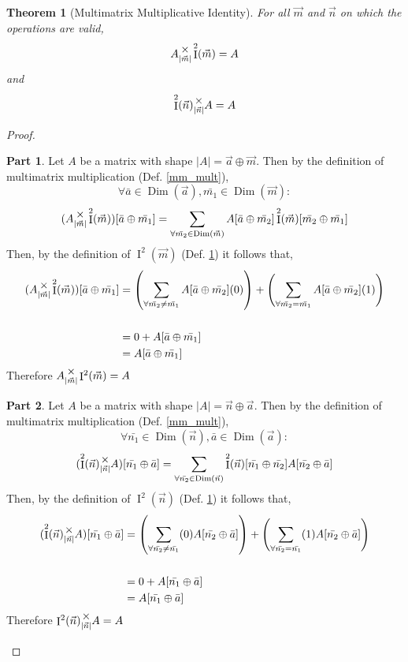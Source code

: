 \documentclass[12pt]{book}
\theoremstyle{plain}
\newtheorem{theorem}{Theorem}[chapter]
\theoremstyle{definition}
\theoremstyle{ppart}
\newtheorem{ppart}{Part}
\theoremstyle{case}
\theoremstyle{solution}
\DeclareMathOperator{\Dim}{Dim}
\DeclareMathOperator{\Ident}{I}
\newcommand{\mmult}[1]{\text{\raisebox{1ex}{$\underset{#1}{\times}$}}}
\begin{document}
\begin{theorem}[Multimatrix Multiplicative Identity]
\label{mm_ident}
For all $\vec{m}$ and $\vec{n}$ on which the operations are valid,
\[
 A \mmult{|\vec{m}|} \Ident^2(\vec{m}) = A
\]
and
\[
 \Ident^2(\vec{n}) \mmult{|\vec{n}|} A = A
\]
\end{theorem}
\begin{proof}
\begin{ppart}
Let $A$ be a matrix with shape $|A| = \vec{a} \oplus \vec{m}$.
Then by the definition of multimatrix multiplication (Def. \ref{mm_mult}),
\[ \forall \bar{a} \in \Dim(\vec{a}), \bar{m_1} \in \Dim(\vec{m}) : \]
\[
 (A \mmult{|\vec{m}|} \Ident^2(\vec{m}))[\bar{a} \oplus \bar{m_1}]
 =
 \sum_{\forall \bar{m_2} \in \Dim(\vec{m})}
 A[\bar{a} \oplus \bar{m_2}] \Ident^2(\vec{m})[\bar{m_2} \oplus \bar{m_1}]
\]
Then, by the definition of $\Ident^2(\vec{m})$ (Def. \ref{mm_ident}) it follows
that,
\begin{align*}
 (A \mmult{|\vec{m}|} \Ident^2(\vec{m}))[\bar{a} \oplus \bar{m_1}]
 &=
 \left(
  \sum_{\forall \bar{m_2} \ne \bar{m_1}}
  A[\bar{a} \oplus \bar{m_2}] (0)
 \right)
 +
 \left(
  \sum_{\forall \bar{m_2} = \bar{m_1}}
  A[\bar{a} \oplus \bar{m_2}] (1)
 \right) \\
 \\
 &= 0 + A[\bar{a} \oplus \bar{m_1}] \\
 &= A[\bar{a} \oplus \bar{m_1}]
\end{align*}
Therefore $A \mmult{|\vec{m}|} \Ident^2(\vec{m}) = A$
\end{ppart}
\begin{ppart}
Let $A$ be a matrix with shape $|A| = \vec{n} \oplus \vec{a}$.
Then by the definition of multimatrix multiplication (Def. \ref{mm_mult}),
\[ \forall  \bar{n_1} \in \Dim(\vec{n}), \bar{a} \in \Dim(\vec{a}) : \]
\[
 (\Ident^2(\vec{n}) \mmult{|\vec{n}|} A)[\bar{n_1} \oplus \bar{a}]
 =
 \sum_{\forall \bar{n_2} \in \Dim(\vec{n})}
 \Ident^2(\vec{n})[\bar{n_1} \oplus \bar{n_2}]A[\bar{n_2} \oplus \bar{a}] 
\]
Then, by the definition of $\Ident^2(\vec{n})$ (Def. \ref{mm_ident}) it follows
that,
\begin{align*}
 (\Ident^2(\vec{n}) \mmult{|\vec{n}|} A)[\bar{n_1} \oplus \bar{a}]
 &=
 \left(
  \sum_{\forall \bar{n_2} \ne \bar{n_1}}
  (0) A[\bar{n_2} \oplus \bar{a}]
 \right)
 +
 \left(
  \sum_{\forall \bar{n_2} = \bar{n_1}}
  (1) A[\bar{n_2} \oplus \bar{a}]
 \right) \\
 \\
 &= 0 + A[\bar{n_1} \oplus \bar{a}] \\
 &= A[\bar{n_1} \oplus \bar{a}]
\end{align*}
Therefore $\Ident^2(\vec{n}) \mmult{|\vec{n}|} A = A$
\end{ppart}
\end{proof}
\end{document}
